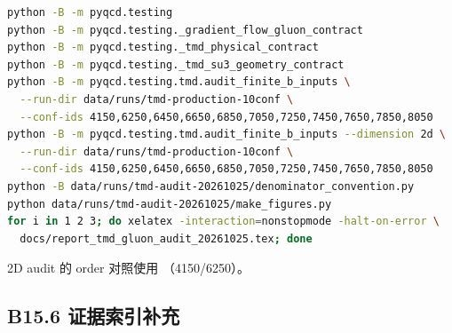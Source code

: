 \documentclass[UTF8]{ctexart}
\newcommand{\code}[1]{\texttt{\detokenize{#1}}}
\begin{document}
\begin{lstlisting}[language=bash,numbers=none]
python -B -m pyqcd.testing
python -B -m pyqcd.testing._gradient_flow_gluon_contract
python -B -m pyqcd.testing._tmd_physical_contract
python -B -m pyqcd.testing._tmd_su3_geometry_contract
python -B -m pyqcd.testing.tmd.audit_finite_b_inputs \
  --run-dir data/runs/tmd-production-10conf \
  --conf-ids 4150,6250,6450,6650,6850,7050,7250,7450,7650,7850,8050
python -B -m pyqcd.testing.tmd.audit_finite_b_inputs --dimension 2d \
  --run-dir data/runs/tmd-production-10conf \
  --conf-ids 4150,6250,6450,6650,6850,7050,7250,7450,7650,7850,8050
python -B data/runs/tmd-audit-20261025/denominator_convention.py
python data/runs/tmd-audit-20261025/make_figures.py
for i in 1 2 3; do xelatex -interaction=nonstopmode -halt-on-error \
  docs/report_tmd_gluon_audit_20261025.tex; done
\end{lstlisting}
2D audit 的 order 对照使用 \code{--transverse-order 0,1}（4150/6250）。

\subsection{B15.6 证据索引补充}
\end{document}
